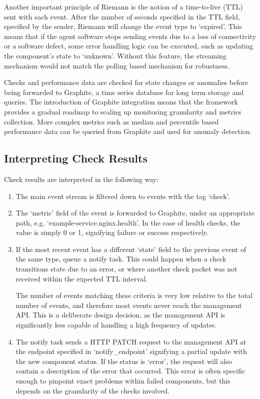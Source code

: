 \documentclass{cshonours}
\begin{document}
Another important principle of Riemann is the notion of a time-to-live (TTL) sent with each event. After the number of seconds specified in the TTL field, specified by the sender, Riemann will change the event type to `expired'. This means that if the agent software stops sending events due to a loss of connectivity or a software defect, some error handling logic can be executed, such as updating the component's state to `unknown'. Without this feature, the streaming mechanism would not match the polling based mechanism for robustness.

Checks and performance data are checked for state changes or anomalies before being forwarded to Graphite, a time series database for long term storage and queries. The introduction of Graphite integration means that the framework provides a gradual roadmap to scaling up monitoring granularity and metrics collection. More complex metrics such as median and percentile based performance data can be queried from Graphite and used for anomaly detection.

\subsection{Interpreting Check Results}

Check results are interpreted in the following way:

\begin{enumerate}
  \item The main event stream is filtered down to events with the tag `check'.
  \item The `metric' field of the event is forwarded to Graphite, under an appropriate path, e.g. `example-service.nginx.health'. In the case of health checks, the value is simply 0 or 1, signifying failure or success respectively.
  \item If the most recent event has a different `state' field to the previous event of the same type, queue a notify task. This could happen when a check transitions state due to an error, or where another check packet was not received within the expected TTL interval.

    The number of events matching these criteria is very low relative to the total number of events, and therefore most events never reach the management API. This is a deliberate design decision, as the management API is significantly less capable of handling a high frequency of updates.
  \item The notify task sends a HTTP PATCH request to the management API at the endpoint specified in `notify\_endpoint' signifying a partial update with the new component status. If the status is `error', the request will also contain a description of the error that occurred. This error is often specific enough to pinpoint exact problems within failed components, but this depends on the granularity of the checks involved.
\end{enumerate}
\end{document}
